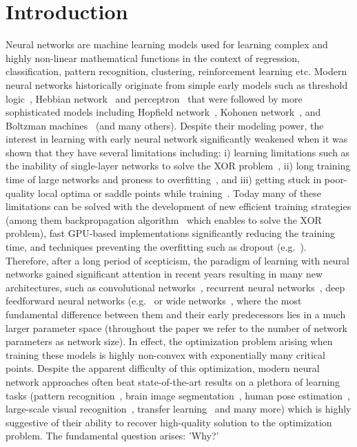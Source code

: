 \documentclass[twoside]{article}
\begin{document}
\section{Introduction}

Neural networks are machine learning models used for learning complex and highly non-linear mathematical functions in the context of regression, classification, pattern recognition, clustering, reinforcement learning etc. Modern neural networks historically originate from simple early models such as threshold logic~\cite{mcculloch43a}, Hebbian network~\cite{Hebb:1949} and perceptron~\cite{rosenblatt58a} that were followed by more sophisticated models including Hopfield network~\cite{Hopfield:1988:NNP:65669.104422}, Kohonen network~\cite{Kohonen1982}, and Boltzman machines~\cite{Hinton:1986:LRB:104279.104291} (and many others). Despite their modeling power, the interest in learning with early neural network significantly weakened when it was shown that they have several limitations including: i) learning limitations such as the inability of single-layer networks to solve the XOR problem~\cite{minsky69perceptrons}, ii) long training time of large networks and proness to overfitting~\cite{JMLR:v15:srivastava14a}, and iii) getting stuck in poor-quality local optima or saddle points while training~\cite{Larochelle:2009:EST:1577069.1577070}. Today many of these limitations can be solved with the development of new efficient training strategies (among them backpropagation algorithm~\cite{Werbos:74} which enables to solve the XOR problem), fast GPU-based implementations significantly reducing the training time, and techniques preventing the overfitting such as dropout (e.g.~\cite{JMLR:v15:srivastava14a}). Therefore, after a long period of scepticism, the paradigm of learning with neural networks gained significant attention in recent years resulting in many new architectures, such as convolutional networks~\cite{lecun-gradientbased-learning-applied-1998}, recurrent neural networks~\cite{Graves:2009:NCS:1525650.1525782}, deep feedforward neural networks (e.g.~\cite{DBLP:journals/corr/Schmidhuber14} or wide networks~\cite{Huang14}, where the most fundamental difference between them and their early predecessors lies in a much larger parameter space (throughout the paper we refer to the number of network parameters as network size). In effect, the optimization problem arising when training these models is highly non-convex with exponentially many critical points. Despite the apparent difficulty of this optimization, modern neural network approaches often beat state-of-the-art results on a plethora of learning tasks (pattern recognition~\cite{journals/nn/CiresanMMS12}, brain image segmentation~\cite{NIPS2012_4741}, human pose estimation~\cite{DBLP:journals/corr/TompsonJLB14}, large-scale visual recognition~\cite{sermanet-iclr-14}, transfer learning~\cite{conf/icml/GoodfellowCB12} and many more) which is highly suggestive of their ability to recover high-quality solution to the optimization problem. The fundamental question arises: 'Why?' 
\end{document}
